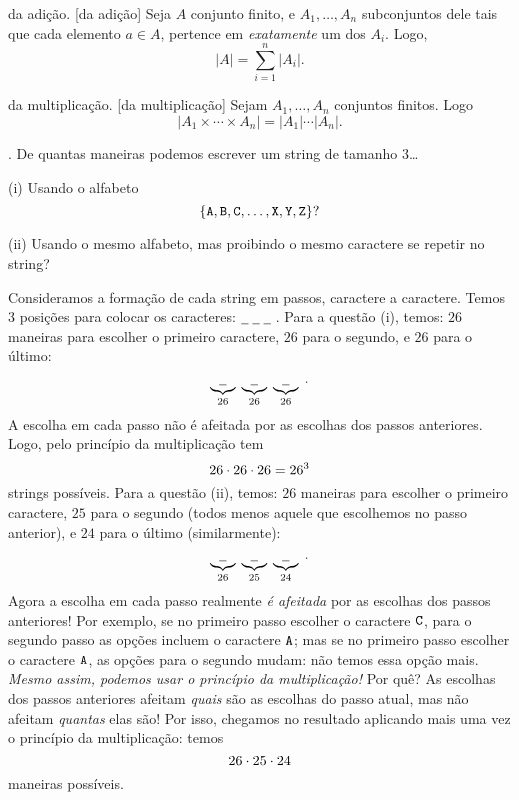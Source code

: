 \principle da adição.
\label{principle_of_addition}%
[da adição]
Seja $A$ conjunto finito, e $A_1,\dotsc,A_n$ subconjuntos dele tais que cada elemento $a\in A$, pertence em \emph{exatamente} um dos $A_i$.
Logo,
$$
|A| = \sum_{i=1}^n |A_i|.
$$

\principle da multiplicação.
\label{principle_of_multiplication}%
[da multiplicação]
Sejam $A_1,\dotsc,A_n$ conjuntos finitos.
Logo
$$
|A_1\times\dotsb\times A_n| = |A_1|\dotsb|A_n|.
$$

\example.
De quantas maneiras podemos escrever um string de tamanho $3$\dots
\item{(i)} Usando o alfabeto
$$
\left\{\text{\tt A}, \text{\tt B}, \text{\tt C}, \dotsc, \text{\tt X}, \text{\tt Y}, \text{\tt Z}\right\}?
$$
\item{(ii)} Usando o mesmo alfabeto, mas proibindo o mesmo caractere se repetir no string?

\solution
Consideramos a formação de cada string em passos, caractere a caractere.
Temos 3 posições para colocar os caracteres:
$
\underline{\phantom{\txt Z}}
\;
\underline{\phantom{\txt Z}}
\;
\underline{\phantom{\txt Z}}
\;
$.
\endgraf
Para a questão (i), temos:
$26$ maneiras para escolher o primeiro caractere,
$26$ para o segundo, e
$26$ para o último:
$$
\underbrace{
\underline{\phantom{\txt Z}}
}_{26}
\;
\underbrace{
\underline{\phantom{\txt Z}}
}_{26}
\;
\underbrace{
\underline{\phantom{\txt Z}}
}_{26}
\;.
$$
A escolha em cada passo não é afeitada por as escolhas dos passos anteriores.
Logo, pelo princípio da multiplicação tem
$$
26\mathbin{\cdot} 26\mathbin{\cdot} 26 = 26^3
$$
strings possíveis.
\endgraf
Para a questão (ii), temos:
$26$ maneiras para escolher o primeiro caractere,
$25$ para o segundo (todos menos aquele que escolhemos no passo anterior), e
$24$ para o último (similarmente):
$$
\underbrace{
\underline{\phantom{\txt Z}}
}_{26}
\;
\underbrace{
\underline{\phantom{\txt Z}}
}_{25}
\;
\underbrace{
\underline{\phantom{\txt Z}}
}_{24}
\;.
$$
Agora a escolha em cada passo realmente \emph{é afeitada} por as escolhas
dos passos anteriores!
Por exemplo, se no primeiro passo escolher o caractere $\text{\tt C}$, para
o segundo passo as opções incluem o caractere $\text{\tt A}$; 
mas se no primeiro passo escolher o caractere $\text{\tt A}$, as opções para o segundo
mudam: não temos essa opção mais.
\emph{Mesmo assim, podemos usar o princípio da multiplicação!}
Por quê?
As escolhas dos passos anteriores afeitam \emph{quais} são as escolhas do passo atual,
mas não afeitam \emph{quantas} elas são!
Por isso, chegamos no resultado aplicando mais uma vez o princípio da multiplicação:
temos
$$
26\mathbin{\cdot} 25\mathbin{\cdot} 24
$$
maneiras possíveis.
\endexample

